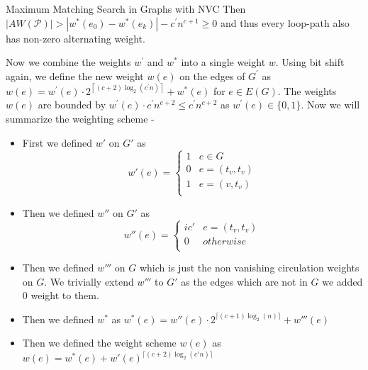 \documentclass{beamer}
\begin{document}
\begin{frame}[allowframebreaks]{Maximum Matching Search in Graphs with NVC}
Then $|A W(\mathcal{P})|>\left|w^*\left(e_0\right)-w^*\left(e_k\right)\right|-c^{\prime} n^{c+1} \geq 0$ and thus every loop-path also has non-zero alternating weight.

Now we combine the weights $w^{\prime}$ and $w^*$ into a single weight $w$. Using bit shift again, we define the new weight $w(e)$ on the edges of $G^{\prime}$ as $w(e)=w^{\prime}(e) \cdot 2^{\left\lceil(c+2) \log _2\left(c^{\prime} n\right)\right\rceil}+w^*(e)$ for $e \in E(G)$. The weights $w(e)$ are bounded by $w^{\prime}(e) \cdot c^{\prime} n^{c+2} \leq c^{\prime} n^{c+2}$ as $w^{\prime}(e) \in\{0,1\}$.
\break
Now we will summarize the weighting scheme -
\begin{itemize}
	\item First we  defined $w'$ on $G'$ as 
		\begin{equation}
		w'(e) = \begin{cases}
			1 & e\in G\\
			0 & e=(t_v,t_v)\\
			1 & e=(v,t_v)\\
		\end{cases}
		\end{equation}
	\item Then we defined $w''$ on $G'$ as
		\begin{equation}
			w''(e) = \begin{cases}
				ic' & e=(t_v,t_v)\\
				0 & otherwise\\
			\end{cases}
		\end{equation}
	\item Then we defined $w'''$ on $G$ which is just the non vanishing circulation weights on $G$. We trivially extend $w'''$ to $G'$ as the edges which are not in $G$ we added $0$ weight to them.\\
	\item Then we defined $w^{*}$ as $w^{*}(e)=w''(e)\cdot 2^{\lceil (c+1) \log_2(n)\rceil}+w'''(e)$
	\item Then we defined the weight scheme $w(e) $ as $w(e)= w^{*}(e)+w'(e)^{\lceil (c+2)\log_2(c'n)\rceil}$	
	
\end{itemize}
\break


\end{frame}
\end{document}
